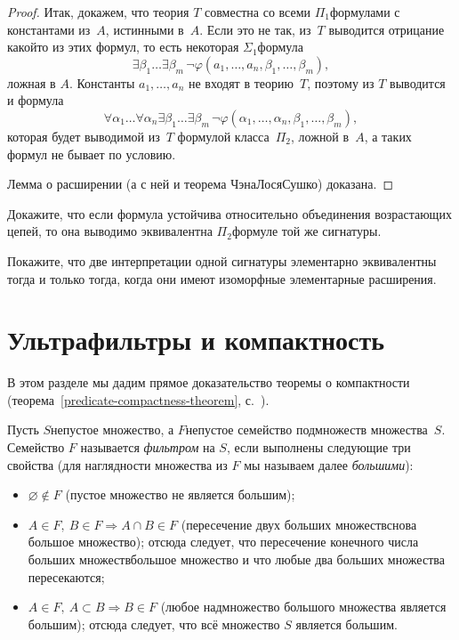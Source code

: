 \begin{proof}
Итак, докажем, что теория $T$ совместна со всеми
$\Pi_1$\д формулами с константами из~$A$, истинными в~$A$. Если
это не так, из~$T$ выводится отрицание какой\д то из этих
формул, то есть некоторая $\Sigma_1$\д формула
        $$
\exists \beta_1\dots\exists \beta_m\,
           \lnot\varphi(a_1,\dots,a_n,\beta_1,\dots,\beta_m),
        $$
ложная в $A$. Константы $a_1,\dots,a_n$ не входят в теорию~$T$,
поэтому из $T$ выводится и формула
        $$
\forall \alpha_1\ldots\forall \alpha_n
\exists \beta_1\dots\exists \beta_m\,
           \lnot\varphi(\alpha_1,\dots,\alpha_n,\beta_1,\dots,\beta_m),
        $$
которая будет выводимой из~$T$ формулой класса~$\Pi_2$, ложной в~$A$,
а таких формул не бывает по условию.

Лемма о расширении (а с ней и теорема Чэна\ч Лося\ч Сушко) доказана.
\end{proof}

\begin{problem}
Докажите, что если формула устойчива относительно объединения
возрастающих цепей, то она выводимо эквивалентна
$\Pi_2$\д формуле той же сигнатуры.
\end{problem}

\begin{problem}
Покажите, что две интерпретации одной сигнатуры элементарно
эквивалентны тогда и только тогда, когда они имеют изоморфные
элементарные расширения.
\end{problem}



\section{Ультрафильтры и компактность}
        \label{ultraproducts}

В этом разделе мы дадим прямое доказательство теоремы о
компактности (теорема~\ref{predicate-compactness-theorem},
с.~\pageref{predicate-compactness-theorem}).

Пусть $S$\т непустое множество,
а $F$\т непустое семейство подмножеств множества~$S$.
Семейство $F$ называется \emph{фильтром}%
на $S$, если выполнены следующие
три свойства (для наглядности
множества из $F$ мы называем далее \emph{большими}):%
%
\begin{itemize}
\item $\varnothing\not\in F$
(пустое множество не является большим);
\item $A\in F,\ B\in F\Rightarrow A\cap B\in F$
(пересечение двух больших множеств\т снова большое множество);
отсюда следует, что пересечение конечного числа больших
множеств\т большое множество и что любые два больших
множества пересекаются;
\item $A\in F,\ A\subset B\Rightarrow B\in F$ (любое
надмножество большого множества является большим); отсюда
следует, что всё множество $S$ является большим.
\end{itemize}

